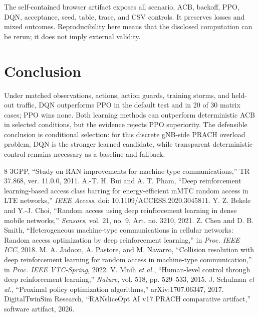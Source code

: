 \documentclass[conference]{IEEEtran}
\begin{document}
The self-contained browser artifact exposes all scenario, ACB, backoff, PPO, DQN, acceptance, seed, table, trace, and CSV controls. It preserves losses and mixed outcomes. Reproducibility here means that the disclosed computation can be rerun; it does not imply external validity.

\section{Conclusion}
Under matched observations, actions, action guards, training storms, and held-out traffic, DQN outperforms PPO in the default test and in 20 of 30 matrix cases; PPO wins none. Both learning methods can outperform deterministic ACB in selected conditions, but the evidence rejects PPO superiority. The defensible conclusion is conditional selection: for this discrete gNB-side PRACH overload problem, DQN is the stronger learned candidate, while transparent deterministic control remains necessary as a baseline and fallback.

\begin{thebibliography}{8}
 3GPP, ``Study on RAN improvements for machine-type communications,'' TR 37.868, ver. 11.0.0, 2011.
 A.-T. H. Bui and A. T. Pham, ``Deep reinforcement learning-based access class barring for energy-efficient mMTC random access in LTE networks,'' \emph{IEEE Access}, doi: 10.1109/ACCESS.2020.3045811.
 Y. Z. Bekele and Y.-J. Choi, ``Random access using deep reinforcement learning in dense mobile networks,'' \emph{Sensors}, vol. 21, no. 9, Art. no. 3210, 2021.
 Z. Chen and D. B. Smith, ``Heterogeneous machine-type communications in cellular networks: Random access optimization by deep reinforcement learning,'' in \emph{Proc. IEEE ICC}, 2018.
 M. A. Jadoon, A. Pastore, and M. Navarro, ``Collision resolution with deep reinforcement learning for random access in machine-type communication,'' in \emph{Proc. IEEE VTC-Spring}, 2022.
 V. Mnih \emph{et al.}, ``Human-level control through deep reinforcement learning,'' \emph{Nature}, vol. 518, pp. 529--533, 2015.
 J. Schulman \emph{et al.}, ``Proximal policy optimization algorithms,'' arXiv:1707.06347, 2017.
 DigitalTwinSim Research, ``RANsliceOpt AI v17 PRACH comparative artifact,'' software artifact, 2026.
\end{thebibliography}
\end{document}
